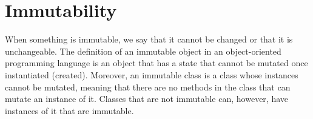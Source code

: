 \documentclass[12pt,twoside]{article}
\begin{document}


\section{Immutability}


When something is immutable, we say that it cannot be changed or that it is unchangeable. The definition of an immutable object in an object-oriented programming language is an object that has a state that cannot be mutated once instantiated (created). Moreover, an immutable class is a class whose instances cannot be mutated, meaning that there are no methods in the class that can mutate an instance of it. Classes that are not immutable can, however, have instances of it that are immutable. 
\end{document}
